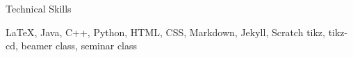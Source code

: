 \begin{rubric}{Technical Skills}

\entry*[Languages]
\LaTeX, Java, C++, Python, HTML, CSS, Markdown, Jekyll, Scratch
%
 tikz, tikz-cd, beamer class, seminar class
\end{rubric}